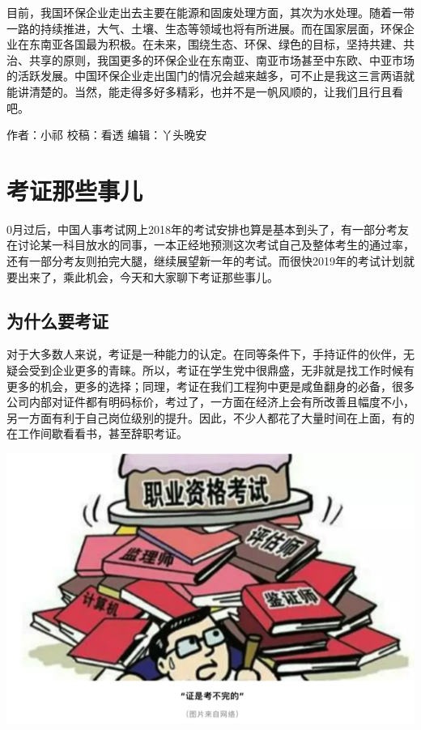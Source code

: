 \documentclass[
]{book}
\begin{document}
目前，我国环保企业走出去主要在能源和固废处理方面，其次为水处理。随着一带一路的持续推进，大气、土壤、生态等领域也将有所进展。而在国家层面，环保企业在东南亚各国最为积极。在未来，围绕生态、环保、绿色的目标，坚持共建、共治、共享的原则，我国更多的环保企业在东南亚、南亚市场甚至中东欧、中亚市场的活跃发展。中国环保企业走出国门的情况会越来越多，可不止是我这三言两语就能讲清楚的。当然，能走得多好多精彩，也并不是一帆风顺的，让我们且行且看吧。

作者：小祁
校稿：看透
编辑：丫头晚安

\hypertarget{ux8003ux8bc1ux90a3ux4e9bux4e8bux513f}{%
\section{考证那些事儿}\label{ux8003ux8bc1ux90a3ux4e9bux4e8bux513f}}

0月过后，中国人事考试网上2018年的考试安排也算是基本到头了，有一部分考友在讨论某一科目放水的同事，一本正经地预测这次考试自己及整体考生的通过率，还有一部分考友则拍完大腿，继续展望新一年的考试。而很快2019年的考试计划就要出来了，乘此机会，今天和大家聊下考证那些事儿。

\hypertarget{ux4e3aux4ec0ux4e48ux8981ux8003ux8bc1}{%
\subsection{为什么要考证}\label{ux4e3aux4ec0ux4e48ux8981ux8003ux8bc1}}

对于大多数人来说，考证是一种能力的认定。在同等条件下，手持证件的伙伴，无疑会受到企业更多的青睐。所以，考证在学生党中很鼎盛，无非就是找工作时候有更多的机会，更多的选择；同理，考证在我们工程狗中更是咸鱼翻身的必备，很多公司内部对证件都有明码标价，考过了，一方面在经济上会有所改善且幅度不小，另一方面有利于自己岗位级别的提升。因此，不少人都花了大量时间在上面，有的在工作间歇看看书，甚至辞职考证。

\includegraphics[width=8.33in]{images/kaozheng1}
\end{document}
